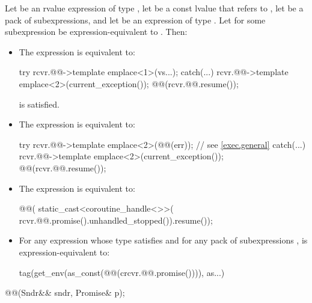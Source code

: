 \pnum
Let  be an rvalue expression of type ,
let  be a const lvalue that refers to ,
let  be a pack of subexpressions, and
let  be an expression of type .
Let 
for some subexpression  be expression-equivalent to
.
Then:
\begin{itemize}
\item
The expression  is equivalent to:
\begin{codeblock}
try {
  rcvr.@@->template emplace<1>(vs...);
} catch(...) {
  rcvr.@@->template emplace<2>(current_exception());
}
@@(rcvr.@@.resume());
\end{codeblock}

\mandates
{}
is satisfied.
\item
The expression  is equivalent to:
\begin{codeblock}
try {
  rcvr.@@->template emplace<2>(@@(err));  // see \ref{exec.general}
} catch(...) {
  rcvr.@@->template emplace<2>(current_exception());
}
@@(rcvr.@@.resume());
\end{codeblock}
\item
The expression  is equivalent to:
\begin{codeblock}
@@(
  static_cast<coroutine_handle<>>(
    rcvr.@@.promise().unhandled_stopped()).resume());
\end{codeblock}
\item
For any expression 
whose type satisfies  and
for any pack of subexpressions ,
 is expression-equivalent to:
\begin{codeblock}
tag(get_env(as_const(@@(crcvr.@@.promise()))),
    as...)
\end{codeblock}
\end{itemize}

\begin{itemdecl}
@@(Sndr&& sndr, Promise& p);
\end{itemdecl}


